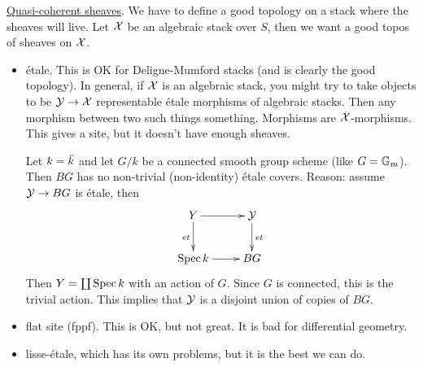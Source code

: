 

\underline{Quasi-coherent sheaves}. We have to define a good topology
on a stack where the sheaves will live. Let $\mathcal{X}$ be an algebraic
stack over $S$, then we want a good topos of sheaves on $\mathcal{X}$.
\begin{itemize}
 \item \'etale. This is OK for Deligne-Mumford stacks (and is clearly
the good topology). In general, if $\mathcal{X}$ is an algebraic stack, you
might try to take objects to be $\mathcal{Y}\to \mathcal{X}$ representable \'etale
morphisms of algebraic stacks. Then any morphism between two such
things something. Morphisms are $\mathcal{X}$-morphisms. This gives a site,
but it doesn't have enough sheaves.

 Let $k=\bbar k$ and let $G/k$ be a connected smooth group scheme
(like $G=\mathbb{G}_m$). Then $BG$ has no non-trivial (non-identity) \'etale
covers. Reason: assume $\mathcal{Y}\to BG$ is \'etale, then
 \[\xymatrix{
  Y\ar[r]\ar[d]_{et} & \Y\ar[d]^{et}\\
  \spec k \ar[r] & BG
 }\]
 Then $Y=\coprod \operatorname{Spec} k$ with an action of $G$. Since $G$ is
connected, this is the trivial action. This implies that $\mathcal{Y}$ is a
disjoint union of copies of $BG$.

 \item flat site (fppf). This is OK, but not great. It is bad for
differential geometry.

 \item lisse-\'etale, which has its own problems, but it is the best
we can do.
\end{itemize}

